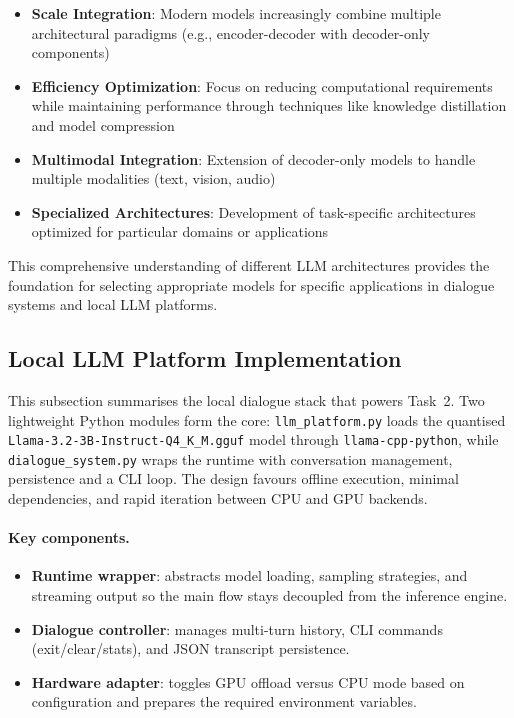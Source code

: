 \documentclass[12pt,a4paper]{article}
\begin{document}
\begin{itemize}
    \item \textbf{Scale Integration}: Modern models increasingly combine multiple architectural paradigms (e.g., encoder-decoder with decoder-only components)
    \item \textbf{Efficiency Optimization}: Focus on reducing computational requirements while maintaining performance through techniques like knowledge distillation and model compression
    \item \textbf{Multimodal Integration}: Extension of decoder-only models to handle multiple modalities (text, vision, audio)
    \item \textbf{Specialized Architectures}: Development of task-specific architectures optimized for particular domains or applications
\end{itemize}

This comprehensive understanding of different LLM architectures provides the foundation for selecting appropriate models for specific applications in dialogue systems and local LLM platforms.




\subsection{Local LLM Platform Implementation}

This subsection summarises the local dialogue stack that powers Task~2. Two lightweight Python modules form the core: \texttt{llm\_platform.py} loads the quantised \texttt{Llama-3.2-3B-Instruct-Q4\_K\_M.gguf} model through \texttt{llama-cpp-python}, while \texttt{dialogue\_system.py} wraps the runtime with conversation management, persistence and a CLI loop. The design favours offline execution, minimal dependencies, and rapid iteration between CPU and GPU backends.

\paragraph{Key components.}
\begin{itemize}[leftmargin=1.2em]
    \item \textbf{Runtime wrapper}: abstracts model loading, sampling strategies, and streaming output so the main flow stays decoupled from the inference engine.
    \item \textbf{Dialogue controller}: manages multi-turn history, CLI commands (exit/clear/stats), and JSON transcript persistence.
    \item \textbf{Hardware adapter}: toggles GPU offload versus CPU mode based on configuration and prepares the required environment variables.
\end{itemize}
\end{document}
